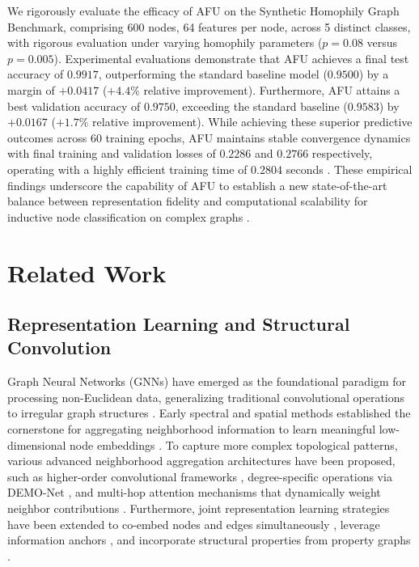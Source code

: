 \documentclass[10pt,twocolumn]{article}
\begin{document}
We rigorously evaluate the efficacy of \textsc{AFU} on the Synthetic Homophily Graph Benchmark, comprising 600 nodes, 64 features per node, across 5 distinct classes, with rigorous evaluation under varying homophily parameters ($p=0.08$ versus $p=0.005$). Experimental evaluations demonstrate that \textsc{AFU} achieves a final test accuracy of $0.9917$, outperforming the standard baseline model ($0.9500$) by a margin of $+0.0417$ ($+4.4\%$ relative improvement). Furthermore, \textsc{AFU} attains a best validation accuracy of $0.9750$, exceeding the standard baseline ($0.9583$) by $+0.0167$ ($+1.7\%$ relative improvement). While achieving these superior predictive outcomes across 60 training epochs, \textsc{AFU} maintains stable convergence dynamics with final training and validation losses of $0.2286$ and $0.2766$ respectively, operating with a highly efficient training time of $0.2804$ seconds \cite{ref_7, ref_13}. These empirical findings underscore the capability of \textsc{AFU} to establish a new state-of-the-art balance between representation fidelity and computational scalability for inductive node classification on complex graphs \cite{ref_4, ref_19}.

\section{Related Work}
\subsection{Representation Learning and Structural Convolution}
Graph Neural Networks (GNNs) have emerged as the foundational paradigm for processing non-Euclidean data, generalizing traditional convolutional operations to irregular graph structures \cite{ref_6, ref_17, ref_25}. Early spectral and spatial methods established the cornerstone for aggregating neighborhood information to learn meaningful low-dimensional node embeddings \cite{ref_32}. To capture more complex topological patterns, various advanced neighborhood aggregation architectures have been proposed, such as higher-order convolutional frameworks \cite{ref_26}, degree-specific operations via DEMO-Net \cite{ref_5}, and multi-hop attention mechanisms that dynamically weight neighbor contributions \cite{ref_22}. Furthermore, joint representation learning strategies have been extended to co-embed nodes and edges simultaneously \cite{ref_1}, leverage information anchors \cite{ref_2}, and incorporate structural properties from property graphs \cite{ref_4}. 
\end{document}

